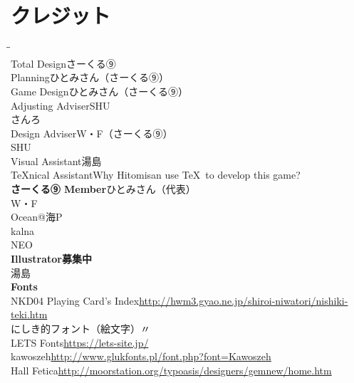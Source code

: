 \documentclass[line_length=22zw,number_of_lines=45,twocolumn]{jlreq}
\newcommand{\hmemph}[1]{\textbf{#1}}
\begin{document}
\onecolumn
\section{クレジット}
\begin{tabbing}
	\hspace{15\zw}\=\hspace{15\zw}\=\kill\\
	Total Design\>さーくる⑨\\
	Planning\>ひとみさん（さーくる⑨）\\
	Game Design\>ひとみさん（さーくる⑨）\\
	Adjusting Adviser\>SHU\\
	\>さんろ\\
	Design Adviser\>W・F（さーくる⑨）\\
	\>SHU\\
	Visual Assistant\>湯島\\
	\TeX nical Assistant\>Why Hitomisan use \TeX\ to develop this game?\\
	\hmemph{さーくる⑨ Member}\>ひとみさん（代表）\\
	\>W・F\\
	\>Ocean@海P\\
	\>kalna\\
	\>NEO\\
	\hmemph{Illustrator}\>\hmemph{募集中}\\
	湯島\\
	\hmemph{Fonts}\\
	NKD04 Playing Card's Index\>\url{http://hwm3.gyao.ne.jp/shiroi-niwatori/nishiki-teki.htm}\\
	にしき的フォント（絵文字）\>〃\\
	LETS Fonts\>\url{https://lets-site.jp/}\\
	kawoszeh\>\url{http://www.glukfonts.pl/font.php?font=Kawoszeh}\\
	Hall Fetica\>\url{http://moorstation.org/typoasis/designers/gemnew/home.htm}
\end{tabbing}

\doclicenseThis
\end{document}
